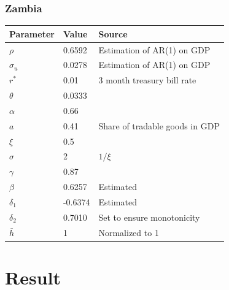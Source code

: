 \documentclass[mathserif]{beamer}
\begin{document}
    \begin{frame}
        \frametitle{Zambia}
        \centering
        \begin{tabular}{@{}lll@{}}
        \toprule
        Parameter  & Value  & Source                                                                         \\
        \midrule

        $\rho$     & 0.6592 & Estimation of AR(1) on GDP\\
        $\sigma_u$ & 0.0278 & Estimation of AR(1) on GDP\\
        $r^*$      & 0.01 & 3 month treasury bill rate \\
        $\theta$   & 0.0333 & \citet*{trebesch-2011-sovereign}                                              \\
        $\alpha$   & 0.66   &                                                        \\
        $a$        & 0.41   &Share of tradable goods in GDP                    \\
        $\xi$      & 0.5   & \citet{Na-18}                              \\
        $\sigma$   & 2   & $1 / \xi$                                                                      \\
        $\gamma$   & 0.87   & \citet*{wage-rigidity-data}                  \\
        $\beta$    & 0.6257  &  Estimated \\
        $\delta_1$ &  -0.6374 &   Estimated  \\
        $\delta_2$ &  0.7010   &     Set to ensure monotonicity   \\
        $\bar{h}$  & 1      & Normalized to 1\\
        \bottomrule
        \end{tabular}%
    \end{frame}

    \section{Result}
\end{document}
